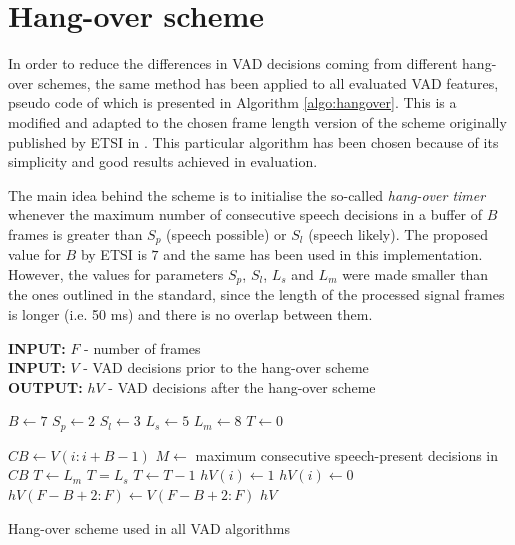 
\section{Hang-over scheme}
\label{sec:hang}

In order to reduce the differences in VAD decisions coming from different hang-over schemes, the same method has been applied to all evaluated VAD features, pseudo code of which is presented in Algorithm \ref{algo:hangover}. This is a modified and adapted to the chosen frame length version of the scheme originally published by ETSI in \cite{ETSIHangover}. This particular algorithm has been chosen because of its simplicity and good results achieved in evaluation.

The main idea behind the scheme is to initialise the so-called \emph{hang-over timer} whenever the maximum number of consecutive speech decisions in a buffer of $B$ frames is greater than $S_p$ (speech possible) or $S_l$ (speech likely). The proposed value for $B$ by ETSI is $7$ and the same has been used in this implementation. However, the values for parameters $S_p$, $S_l$, $L_s$ and $L_m$ were made smaller than the ones outlined in the standard, since the length of the processed signal frames is longer (i.e. 50 ms) and there is no overlap between them.

\begin{algorithm}
\textbf{INPUT:} $F$ - number of frames \\
\textbf{INPUT:} $V$ - VAD decisions prior to the hang-over scheme \\
\textbf{OUTPUT:} $hV$ - VAD decisions after the hang-over scheme
\begin{algorithmic}[1]
\STATE $B \leftarrow 7$ 
\STATE $S_p \leftarrow 2$  
\STATE $S_l \leftarrow 3$ 
\STATE $L_s \leftarrow 5$ 
\STATE $L_m \leftarrow 8$ 
\STATE
\STATE $T \leftarrow 0$ 

\STATE $CB \leftarrow V(i:i+B-1)$ 
\STATE $M \leftarrow$ maximum consecutive speech-present decisions in $CB$
\STATE $T \leftarrow L_m$
\STATE $T = L_s$
\STATE $T \leftarrow T-1$
\ENDIF
{}
\STATE $hV(i) \leftarrow 1$
\ELSE
\STATE $hV(i) \leftarrow 0$
\ENDIF
\ENDFOR
\STATE $hV(F-B+2:F) \leftarrow V(F-B+2:F)$ 
\RETURN $hV$
\end{algorithmic}
\caption{Hang-over scheme used in all VAD algorithms}
\label{algo:hangover}
\end{algorithm}

